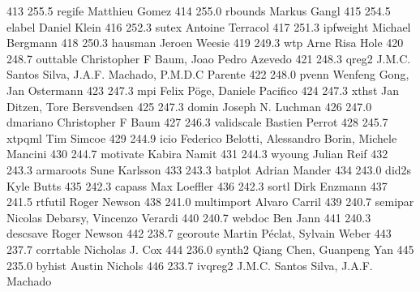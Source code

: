    413    255.5    regife        Matthieu Gomez                          
   414    255.0    rbounds       Markus Gangl                            
   415    254.5    elabel        Daniel Klein                            
   416    252.3    sutex         Antoine Terracol                        
   417    251.3    ipfweight     Michael Bergmann                        
   418    250.3    hausman       Jeroen Weesie                           
   419    249.3    wtp           Arne Risa Hole                          
   420    248.7    outtable      Christopher F Baum, Joao Pedro Azevedo  
   421    248.3    qreg2         J.M.C. Santos Silva, J.A.F. Machado,    
                                   P.M.D.C Parente                         
   422    248.0    pvenn         Wenfeng Gong, Jan Ostermann             
   423    247.3    mpi           Felix Pöge, Daniele Pacifico           
   424    247.3    xthst         Jan Ditzen, Tore Bersvendsen            
   425    247.3    domin         Joseph N. Luchman                       
   426    247.0    dmariano      Christopher F Baum                      
   427    246.3    validscale    Bastien Perrot                          
   428    245.7    xtpqml        Tim Simcoe                              
   429    244.9    icio          Federico Belotti, Alessandro Borin,     
                                   Michele Mancini                         
   430    244.7    motivate      Kabira Namit                            
   431    244.3    wyoung        Julian Reif                             
   432    243.3    armaroots     Sune Karlsson                           
   433    243.3    batplot       Adrian Mander                           
   434    243.0    did2s         Kyle Butts                              
   435    242.3    capass        Max Loeffler                            
   436    242.3    sortl         Dirk Enzmann                            
   437    241.5    rtfutil       Roger Newson                            
   438    241.0    multimport    Alvaro Carril                           
   439    240.7    semipar       Nicolas Debarsy, Vincenzo Verardi       
   440    240.7    webdoc        Ben Jann                                
   441    240.3    descsave      Roger Newson                            
   442    238.7    georoute      Martin Péclat, Sylvain Weber           
   443    237.7    corrtable     Nicholas J. Cox                         
   444    236.0    synth2        Qiang Chen, Guanpeng Yan                
   445    235.0    byhist        Austin Nichols                          
   446    233.7    ivqreg2       J.M.C. Santos Silva, J.A.F. Machado     
